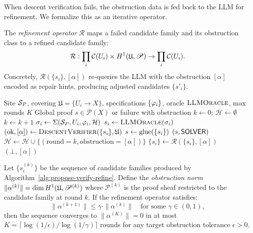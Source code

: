 \documentclass[11pt]{article}
\newcommand{\DescentVerifier}{\textsc{DescentVerifier}}
\newcommand{\LLMOracle}{\textsc{LLMOracle}}
\newcommand{\CandSpace}{\mathcal{C}}
\newcommand{\PromptStrat}{\Sigma}
\newcommand{\RefineOp}{\mathcal{R}}
\newcommand{\HintBundle}{\mathcal{H}}
\newcommand{\ProofSheaf}{\mathscr{P}}
\begin{document}
When descent verification fails, the obstruction data is fed back to
the LLM for refinement.  We formalize this as an iterative operator.

\begin{definition}\label{def:refinement-op}
The \emph{refinement operator} $\RefineOp$ maps a failed candidate
family and its obstruction class to a refined candidate family:
\[
  \RefineOp : \prod_i \CandSpace(U_i) \times \Hcoh{1}(\mathfrak{U}, \ProofSheaf)
  \to \prod_i \CandSpace(U_i).
\]
Concretely, $\RefineOp(\{s_i\}, [\alpha])$ re-queries the LLM with
the obstruction $[\alpha]$ encoded as repair hints, producing
adjusted candidates $\{s'_i\}$.
\end{definition}

\begin{algorithm}[H]
\caption{$\textsc{ProposeVerifyRefine}$: LLM-Guided Proof Search}
\label{alg:propose-verify-refine}
\begin{algorithmic}[1]
\REQUIRE Site $\mathcal{S}_P$, covering $\mathfrak{U} = \{U_i \to X\}$,
  specifications $\{\varphi_i\}$, oracle $\LLMOracle$, max rounds $K$
\ENSURE Global proof $s \in \ProofSheaf(X)$ or failure with obstruction
\STATE $k \leftarrow 0$; $\HintBundle \leftarrow \emptyset$
\REPEAT
  \STATE $k \leftarrow k + 1$
    \STATE $\sigma_i \leftarrow \PromptStrat(\Site_P, U_i, \prop_i, \HintBundle)$
    \STATE $s_i \leftarrow \LLMOracle(\sigma_i)$
  \ENDFOR
  \STATE $(\text{ok}, [\alpha]) \leftarrow \DescentVerifier(\{s_i\}, \mathfrak{U})$
    \STATE $s \leftarrow \mathrm{glue}(\{s_i\})$
    \RETURN $(s, \mathsf{SOLVER})$
  \ELSE
    \STATE $\HintBundle \leftarrow \HintBundle \cup
      \{(\text{round}=k, \text{obstruction}=[\alpha])\}$
    \STATE $\{s_i\} \leftarrow \RefineOp(\{s_i\}, [\alpha])$
  \ENDIF
{}
\RETURN $(\bot, [\alpha])$
\end{algorithmic}
\end{algorithm}

\begin{theorem}\label{thm:convergence}
Let $\{s_i^{(k)}\}$ be the sequence of candidate families produced by
Algorithm~\ref{alg:propose-verify-refine}.  Define the
\emph{obstruction norm}
$\|\alpha^{(k)}\| = \dim \Hcoh{1}(\mathfrak{U}, \ProofSheaf^{(k)})$
where $\ProofSheaf^{(k)}$ is the proof sheaf restricted to the
candidate family at round $k$.  If the refinement operator satisfies:
\[
  \|\alpha^{(k+1)}\| \leq \gamma \cdot \|\alpha^{(k)}\|
  \quad \text{for some } \gamma \in (0, 1),
\]
then the sequence converges to $\|\alpha^{(K)}\| = 0$ in at most
$K = \lceil \log(1/\epsilon) / \log(1/\gamma) \rceil$ rounds for any
target obstruction tolerance $\epsilon > 0$.
\end{theorem}
\end{document}
